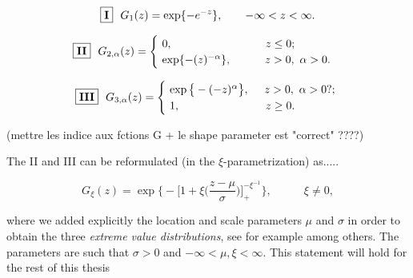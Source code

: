 \documentclass[11pt,a4paper,openany ]{book}
\begin{document}
\begin{equation}\label{gumb}
\boxed{\textbf{\text{I}}}\ \   G_1(z)= 
\exp\{-e^{-z}\}, \ \ \ \ \ \ -\infty<z<\infty.    
\end{equation}


\begin{equation} \label{frech}
\boxed{\textbf{\text{II}}} \ \ G_{2,\alpha}(z)=
\begin{cases}
\ 0, \ \ \ \ \ \ \ \ \ \ \ \ \ \ \ \ \ \ \ \ \ \ \ \ \ z\leq 0; \\
\ \exp\{-(z)^{-\alpha}\}, \ \ \ \ \ \ \ \ \ z>0,\ \alpha>0.    
\end{cases}
\end{equation}

\begin{equation} \label{weib}
\ \ \boxed{\textbf{\text{III}}} \ \ G_{3,\alpha}(z)=\begin{cases}
\ \exp\big\{-(-z)^{\alpha}\big\}, \ \ \ \  z>0,\ \alpha>0?;     \\
\  1, \ \ \ \ \ \ \ \ \ \ \ \ \ \ \ \ \ \ \ \ \ \ \ z\geq 0.
\end{cases}
\end{equation}

(mettre les indice aux fctions G + le shape parameter est "correct" ????)

The II and III can be reformulated (in the $\xi$-parametrization) as.....

\begin{equation}\label{GEVxineq0}
G_{\xi}(z)=\exp\Bigg\{-\bigg[1+\xi \bigg(\frac{z-\mu}{\sigma}\bigg)\bigg]_+^{-\xi^{-1}}\Bigg\}, \ \ \ \ \ \ \ \ \ \ \ \ \  \xi\neq 0,
\end{equation}

where we added explicitly the location and scale parameters $\mu$ and $\sigma$ in order to obtain the three \emph{extreme value distributions}, see for example \cite[pp.16]{reiss_statistical_2007} among others. The parameters are such that $ \sigma>0$ and $-\infty<\mu,\xi<\infty$.
This statement will hold for the rest of this thesis
\end{document}
